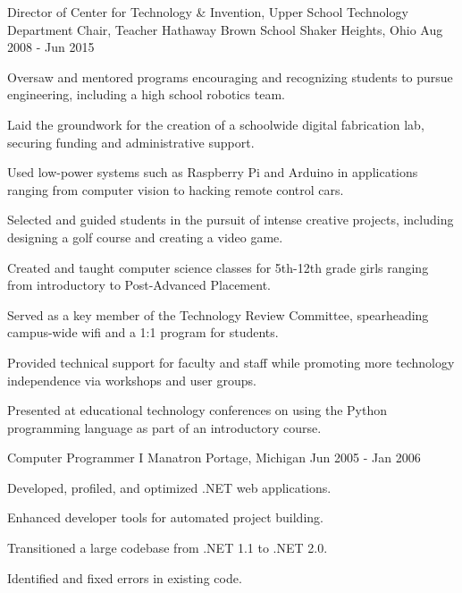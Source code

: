 \begin{cventries}

\cventry
{Director of Center for Technology \& Invention, Upper School Technology Department Chair, Teacher} %
{Hathaway Brown School} %
{Shaker Heights, Ohio} %
{Aug 2008 - Jun 2015} %
{ %
\begin{cvitems}
\item {Oversaw and mentored programs encouraging and recognizing students to pursue engineering, including a high school robotics team.}
\item {Laid the groundwork for the creation of a schoolwide digital fabrication lab, securing funding and administrative support.}
\item {Used low-power systems such as Raspberry Pi and Arduino in applications ranging from computer vision to hacking remote control cars.}
\item {Selected and guided students in the pursuit of intense creative projects, including designing a golf course and creating a video game.}
\item {Created and taught computer science classes for 5th-12th grade girls ranging from introductory to Post-Advanced Placement.}
\item {Served as a key member of the Technology Review Committee, spearheading campus-wide wifi and a 1:1 program for students.}
\item {Provided technical support for faculty and staff while promoting more technology independence via workshops and user groups.}
\item {Presented at educational technology conferences on using the Python programming language as part of an introductory course.}
\end{cvitems}
}


\cventry
{Computer Programmer I} %
{Manatron} %
{Portage, Michigan} %
{Jun 2005 - Jan 2006} %
{ %
\begin{cvitems}
\item {Developed, profiled, and optimized .NET web applications.}
\item {Enhanced developer tools for automated project building.}
\item {Transitioned a large codebase from .NET 1.1 to .NET 2.0.}
\item {Identified and fixed errors in existing code.}
\end{cvitems}
}


\end{cventries}